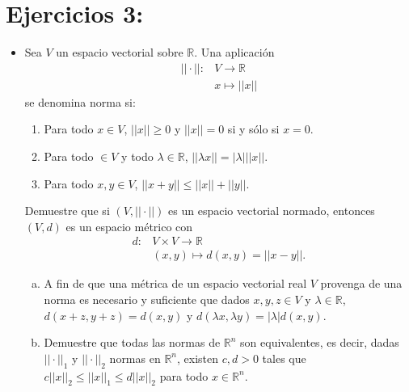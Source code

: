 \section{Ejercicios 3:}
\begin{itemize}[leftmargin=*]
    \item Sea $V$ un espacio vectorial sobre $\mathbb{R}$. Una aplicación 
        \begin{align*}
            ||\cdot||:&V \longrightarrow \mathbb{R}\\
            &x \longmapsto ||x||
        \end{align*}
        se denomina norma si:
        \begin{enumerate}[(1)]
            \item Para todo $x \in V$, $||x||\geq 0$ y $||x||=0$ si y sólo si $x=0$.
            \item Para todo $ \in V$ y todo $\lambda \in \mathbb{R}$, $||\lambda x||=|\lambda|||x||$.
            \item Para todo $x,y \in V$, $||x+y||\leq ||x||+||y||$.
        \end{enumerate}
        Demuestre que si $(V,||\cdot||)$ es un espacio vectorial normado, entonces $(V,d)$ es un espacio métrico con 
        \begin{align*}
            d:&V \times V \longrightarrow \mathbb{R}\\
            &(x,y) \longmapsto d(x,y)=||x-y||.
        \end{align*}
        \begin{enumerate}[a)]
            \item A fin de que una métrica de un espacio vectorial real $V$ provenga de una norma es necesario y suficiente que dados $x,y,z \in V$ y $\lambda \in \mathbb{R}$, $d(x+z,y+z)=d(x,y)$ y $d(\lambda x,\lambda y)=|\lambda|d(x,y)$.
            \item Demuestre que todas las normas de $\mathbb{R}^n$ son equivalentes, es decir, dadas $||\cdot||_1$ y $||\cdot||_2$ normas en $\mathbb{R}^n$, existen $c,d>0$ tales que $c||x||_2\leq ||x||_1\leq d||x||_2$ para todo $x \in \mathbb{R}^n$.
        \end{enumerate}


\end{itemize}

